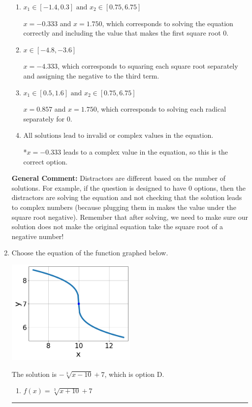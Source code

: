\documentclass{extbook}[14pt]
\newcommand{\litem}[1]{\item #1

\rule{\textwidth}{0.4pt}}
\begin{document}
\begin{enumerate}
{\begin{enumerate}[label=\Alph*.]
This corresponds to not checking that the potential solution $x = -0.333$ leads to a complex value in the original equation.
\item \( x_1 \in [-1.4, 0.3] \text{ and } x_2 \in [0.75,6.75] \)

$x = -0.333$ and $x = 1.750$, which corresponds to solving the equation correctly and including the value that makes the first square root 0.
\item \( x \in [-4.8,-3.6] \)

$x = -4.333$, which corresponds to squaring each square root separately and assigning the negative to the third term.
\item \( x_1 \in [0.5, 1.6] \text{ and } x_2 \in [0.75,6.75] \)

$x = 0.857$ and $x = 1.750$, which corresponds to solving each radical separately for 0.
\item \( \text{All solutions lead to invalid or complex values in the equation.} \)

*$x = -0.333$ leads to a complex value in the equation, so this is the correct option.
\end{enumerate}

\textbf{General Comment:} Distractors are different based on the number of solutions. For example, if the question is designed to have 0 options, then the distractors are solving the equation and not checking that the solution leads to complex numbers (because plugging them in makes the value under the square root negative). Remember that after solving, we need to make sure our solution does not make the original equation take the square root of a negative number!
}
\litem{
Choose the equation of the function graphed below.

\begin{center}
    \includegraphics[width=0.5\textwidth]{../Figures/radicalGraphToEquationCopyB.png}
\end{center}


The solution is \( - \sqrt[3]{x - 10} + 7 \), which is option D.\begin{enumerate}[label=\Alph*.]
\item \( f(x) = \sqrt[3]{x + 10} + 7 \)


\end{enumerate}}
\end{enumerate}
\end{document}
